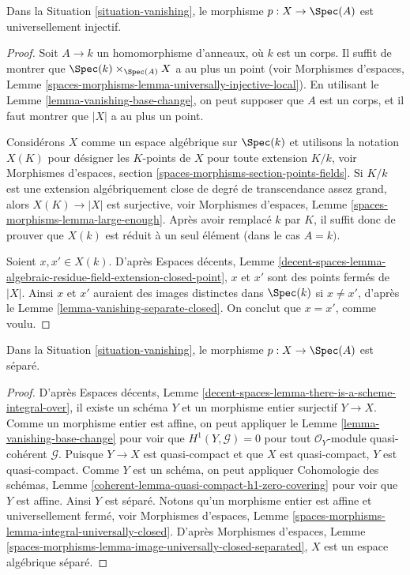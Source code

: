\begin{lemma}
\label{lemma-vanishing-injective}
Dans la Situation \ref{situation-vanishing}, le morphisme $p : X \to \Spec(A)$ est
universellement injectif.
\end{lemma}

\begin{proof}
Soit $A \to k$ un homomorphisme d'anneaux, où $k$ est un corps. Il suffit de
montrer que $\Spec(k) \times_{\Spec(A)} X$ a au plus un point (voir
Morphismes d'espaces, Lemme
\ref{spaces-morphisms-lemma-universally-injective-local}).
En utilisant le Lemme \ref{lemma-vanishing-base-change}, on peut supposer que $A$
est un corps, et il faut montrer que $|X|$ a au plus un point.

\medskip\noindent
Considérons $X$ comme un espace algébrique sur $\Spec(k)$ et utilisons
la notation $X(K)$ pour désigner les $K$-points de $X$
pour toute extension $K/k$, voir
Morphismes d'espaces, section \ref{spaces-morphisms-section-points-fields}.
Si $K/k$ est une extension algébriquement close
de degré de transcendance assez grand, alors $X(K) \to |X|$
est surjective, voir Morphismes d'espaces, Lemme
\ref{spaces-morphisms-lemma-large-enough}. Après avoir remplacé $k$
par $K$, il suffit donc de prouver que $X(k)$ est réduit à un seul élément
(dans le cas $A = k)$.

\medskip\noindent
Soient $x, x' \in X(k)$. D'après Espaces décents, Lemme
\ref{decent-spaces-lemma-algebraic-residue-field-extension-closed-point},
$x$ et $x'$ sont des points fermés de $|X|$. Ainsi $x$ et $x'$
auraient des images distinctes dans $\Spec(k)$ si $x \not = x'$, d'après le
Lemme \ref{lemma-vanishing-separate-closed}. On conclut que
$x = x'$, comme voulu.
\end{proof}

\begin{lemma}
\label{lemma-vanishing-separated}
Dans la Situation \ref{situation-vanishing}, le morphisme $p : X \to \Spec(A)$ est
séparé.
\end{lemma}

\begin{proof}
D'après Espaces décents, Lemme
\ref{decent-spaces-lemma-there-is-a-scheme-integral-over},
il existe un schéma $Y$ et un morphisme entier surjectif
$Y \to X$. Comme un morphisme entier est affine, on peut appliquer le
Lemme \ref{lemma-vanishing-base-change}
pour voir que $H^1(Y, \mathcal{G}) = 0$ pour tout
$\mathcal{O}_Y$-module quasi-cohérent $\mathcal{G}$.
Puisque $Y \to X$ est quasi-compact et que $X$ est quasi-compact,
$Y$ est quasi-compact.
Comme $Y$ est un schéma, on peut appliquer
Cohomologie des schémas, Lemme
\ref{coherent-lemma-quasi-compact-h1-zero-covering}
pour voir que $Y$ est affine. Ainsi $Y$ est séparé.
Notons qu'un morphisme entier est affine et universellement fermé, voir
Morphismes d'espaces, Lemme
\ref{spaces-morphisms-lemma-integral-universally-closed}.
D'après Morphismes d'espaces, Lemme
\ref{spaces-morphisms-lemma-image-universally-closed-separated},
$X$ est un espace algébrique séparé.
\end{proof}

